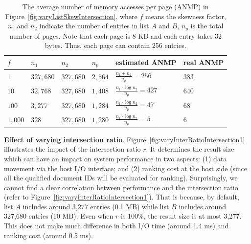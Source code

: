 \begin{table}[tbp]\small
\centering
\begin{tabular}{l|l|l|l|l|l}\hline\hline
$f$ & $n_1$ & $n_2$ & $n_p$ & estimated ANMP & real ANMP \\\hline
$1$ & $327,680$ & $327,680$ & $2,564$ & $\frac{n_1+n_2}{n_p}=256$ & $383$ \\\hline
$10$ & $32,768$ & $327,680$ & $1,408$ & $\frac{n_1\cdot\log n_2}{n_p}=427$ & $640$ \\\hline
$100$ & $3,277$ & $327,680$ & $1,284$ & $\frac{n_1\cdot\log n_2}{n_p}=47$ & $68$ \\\hline
$1,000$ & $328$ & $327,680$ & $1,280$ & $\frac{n_1\cdot\log n_2}{n_p}=5$ & $6$ \\\hline\hline
\end{tabular}
\caption{The average number of memory accesses per page (ANMP) in Figure~\ref{fig:varyListSkewIntersection}, where $f$ means the skewness factor, $n_1$ and $n_2$ indicate the number of entries in list $A$ and $B$, $n_p$ is the total number of pages. Note that each page is 8 KB and each entry takes 32 bytes. Thus, each page can contain 256 entries.}\label{tab:varyListSkewIntersection}
\end{table}


\textbf{Effect of varying intersection ratio}.
Figure~\ref{fig:varyInterRatioIntersection1} illustrates the impact of the intersection ratio $r$.
It determines the result size which can have an impact on system performance in two aspects: (1) data movement via the host I/O interface; and (2) ranking cost at the host side (since all the qualified document IDs will be evaluated for ranking). Surprisingly, we cannot find a clear correlation between performance and the intersection ratio (refer to Figure~\ref{fig:varyInterRatioIntersection1}).
That is because, by default, list $A$ includes around 3,277 entries (0.1 MB) while list $B$ includes around 327,680 entries (10 MB). Even when $r$ is 100\%, the result size is at most 3,277. This does not make much difference in both I/O time (around 1.4 ms) and ranking cost (around 0.5 ms).





